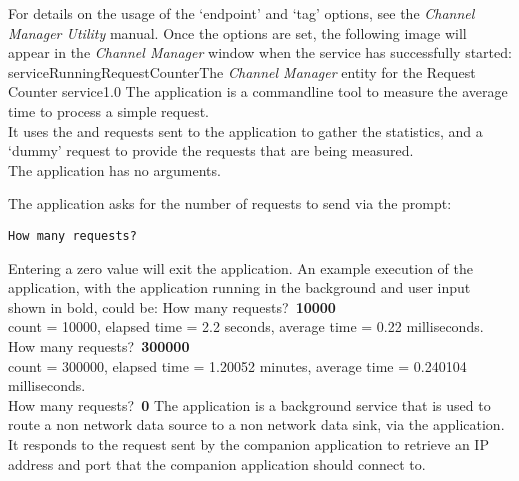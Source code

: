 For details on the usage of the `endpoint' and `tag' options, see the \emph{Channel
Manager Utility} manual.
Once the options are set, the following image will appear in the \emph{Channel Manager}
window when the service has successfully started:
%
{serviceRunningRequestCounter}{The \emph{Channel Manager} entity for the Request Counter
service}{1.0}
\condPage
{}
The  application is a command\longDash{}line tool to
measure the average time to process a simple request.\\

It uses the  and
 requests sent to the
 application to gather the statistics, and a
`dummy' request to provide the requests that are being measured.\\

The application has no arguments.
\insertShortClientParameters{}

The application asks for the number of requests to send via the prompt:
\outputBegin
\begin{verbatim}
How many requests?
\end{verbatim}
\outputEnd{}
Entering a zero value will exit the application.
An example execution of the application, with the 
application running in the background and user input shown in bold, could be:
\outputBegin{}
How many requests?\ \textbf{10000}\\
count = 10000, elapsed time = 2.2 seconds, average time = 0.22 milliseconds.\\
How many requests?\ \textbf{300000}\\
count = 300000, elapsed time = 1.20052 minutes, average time = 0.240104 milliseconds.\\
How many requests?\ \textbf{0}
\outputEnd
{}
\condPage
{}
The  application is a background service that is used to
route a non\longDash\yarp{} network data source to a non\longDash\yarp{} network data
sink, via the  application.\\

It responds to the  request sent by the
companion application  to retrieve an IP address and port
that the companion application should connect to.\\

